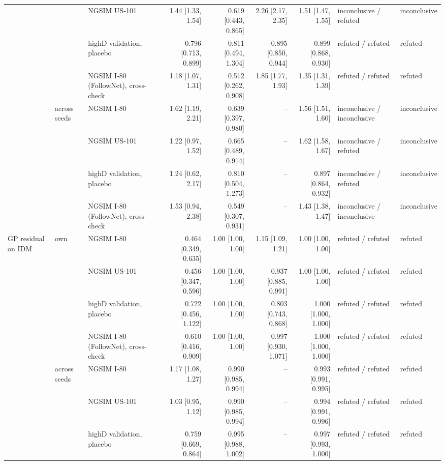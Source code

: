 \begin{longtable}{lllrrrrll}
 &  & NGSIM US-101 & 1.44 [1.33, 1.54] & 0.619 [0.443, 0.865] & 2.26 [2.17, 2.35] & 1.51 [1.47, 1.55] & inconclusive / refuted & inconclusive \\
 &  & highD validation, placebo & 0.796 [0.713, 0.899] & 0.811 [0.494, 1.304] & 0.895 [0.850, 0.944] & 0.899 [0.868, 0.930] & refuted / refuted & refuted \\
 &  & NGSIM I-80 (FollowNet), cross-check & 1.18 [1.07, 1.31] & 0.512 [0.262, 0.908] & 1.85 [1.77, 1.93] & 1.35 [1.31, 1.39] & refuted / refuted & refuted \\
\midrule
 & across seeds & NGSIM I-80 & 1.62 [1.19, 2.21] & 0.639 [0.397, 0.980] & -- & 1.56 [1.51, 1.60] & inconclusive / inconclusive & inconclusive \\
 &  & NGSIM US-101 & 1.22 [0.97, 1.52] & 0.665 [0.489, 0.914] & -- & 1.62 [1.58, 1.67] & inconclusive / refuted & inconclusive \\
 &  & highD validation, placebo & 1.24 [0.62, 2.17] & 0.810 [0.504, 1.273] & -- & 0.897 [0.864, 0.932] & inconclusive / refuted & inconclusive \\
 &  & NGSIM I-80 (FollowNet), cross-check & 1.53 [0.94, 2.38] & 0.549 [0.307, 0.931] & -- & 1.43 [1.38, 1.47] & inconclusive / inconclusive & inconclusive \\
\midrule
GP residual on IDM & own & NGSIM I-80 & 0.464 [0.349, 0.635] & 1.00 [1.00, 1.00] & 1.15 [1.09, 1.21] & 1.00 [1.00, 1.00] & refuted / refuted & refuted \\
 &  & NGSIM US-101 & 0.456 [0.347, 0.596] & 1.00 [1.00, 1.00] & 0.937 [0.885, 0.991] & 1.00 [1.00, 1.00] & refuted / refuted & refuted \\
 &  & highD validation, placebo & 0.722 [0.456, 1.122] & 1.00 [1.00, 1.00] & 0.803 [0.743, 0.868] & 1.000 [1.000, 1.000] & refuted / refuted & refuted \\
 &  & NGSIM I-80 (FollowNet), cross-check & 0.610 [0.416, 0.909] & 1.00 [1.00, 1.00] & 0.997 [0.930, 1.071] & 1.000 [1.000, 1.000] & refuted / refuted & refuted \\
\midrule
 & across seeds & NGSIM I-80 & 1.17 [1.08, 1.27] & 0.990 [0.985, 0.994] & -- & 0.993 [0.991, 0.995] & refuted / refuted & refuted \\
 &  & NGSIM US-101 & 1.03 [0.95, 1.12] & 0.990 [0.985, 0.994] & -- & 0.994 [0.991, 0.996] & refuted / refuted & refuted \\
 &  & highD validation, placebo & 0.759 [0.669, 0.864] & 0.995 [0.988, 1.002] & -- & 0.997 [0.993, 1.000] & refuted / refuted & refuted \\

\end{longtable}
